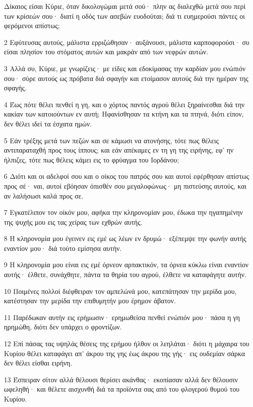 \par Δίκαιος είσαι Κύριε, όταν δικολογώμαι μετά σού· πλην ας διαλεχθώ μετά σου περί των κρίσεών σου· διατί η οδός των ασεβών ευοδούται; διά τι ευημερούσι πάντες οι φερόμενοι απίστως;
\par 2 Εφύτευσας αυτούς, μάλιστα ερριζώθησαν· αυξάνουσι, μάλιστα καρποφορούσι· συ είσαι πλησίον του στόματος αυτών και μακράν από των νεφρών αυτών.
\par 3 Αλλά συ, Κύριε, με γνωρίζεις· με είδες και εδοκίμασας την καρδίαν μου ενώπιόν σου· σύρε αυτούς ως πρόβατα διά σφαγήν και ετοίμασον αυτούς διά την ημέραν της σφαγής.
\par 4 Έως πότε θέλει πενθεί η γη, και ο χόρτος παντός αγρού θέλει ξηραίνεσθαι διά την κακίαν των κατοιούντων εν αυτή; Ηφανίσθησαν τα κτήνη και τα πτηνά, διότι είπον, δεν θέλει ιδεί τα έσχατα ημών.
\par 5 Εάν τρέξης μετά των πεζών και σε κάμωσι να ατονήσης, τότε πως θέλεις αντιπαραταχθή προς τους ίππους; και εάν απέκαμες εν τη γη της ειρήνης, εφ' ην ήλπιζες, τότε πως θέλεις κάμει εις το φρύαγμα του Ιορδάνου;
\par 6 Διότι και οι αδελφοί σου και ο οίκος του πατρός σου και αυτοί εφέρθησαν απίστως προς σέ· ναι, αυτοί εβόησαν όπισθέν σου μεγαλοφώνως· μη πιστεύσης αυτούς, και αν λαλήσωσι καλά προς σε.
\par 7 Εγκατέλιπον τον οίκόν μου, αφήκα την κληρονομίαν μου, έδωκα την ηγαπημένην της ψυχής μου εις τας χείρας των εχθρών αυτής.
\par 8 Η κληρονομία μου έγεινεν εις εμέ ως λέων εν δρυμώ· εξέπεμψε την φωνήν αυτής εναντίον μου· διά τούτο εμίσησα αυτήν.
\par 9 Η κληρονομία μου είναι εις εμέ όρνεον αρπακτικόν, τα όρνεα κύκλω είναι εναντίον αυτής· έλθετε, συνάχθητε, πάντα τα θηρία του αγρού, έλθετε να καταφάγητε αυτήν.
\par 10 Ποιμένες πολλοί διέφθειραν τον αμπελώνά μου, κατεπάτησαν την μερίδα μου, κατέστησαν την μερίδα την επιθυμητήν μου έρημον άβατον.
\par 11 Παρέδωκαν αυτήν εις ερήμωσιν· ερημωθείσα πενθεί ενώπιόν μου· πάσα η γη ηρημώθη, διότι δεν υπάρχει ο φροντίζων.
\par 12 Επί πάσας τας υψηλάς θέσεις της ερήμου ήλθον οι λεηλάται· διότι η μάχαιρα του Κυρίου θέλει καταφάγει απ' άκρου της γης έως άκρου της γής· εις ουδεμίαν σάρκα δεν θέλει είσθαι ειρήνη.
\par 13 Έσπειραν σίτον αλλά θέλουσι θερίσει ακάνθας· εκοπίασαν αλλά δεν θέλουσιν ωφεληθή· και θέλετε αισχυνθή διά τα προϊόντα σας από του φλογερού θυμού του Κυρίου.
